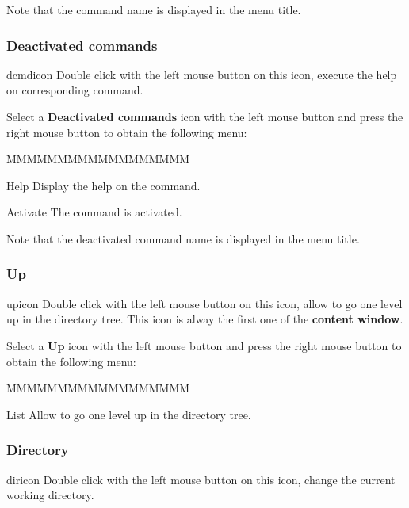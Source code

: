 Note that the command name is displayed in the menu title.


\subsubsection{Deactivated \XPAW{} commands}
\begin{ICON}{dcmdicon}
Double click with the left mouse button on this icon, execute the help on
corresponding \XPAW{} command.
\end{ICON}

Select a {\bf Deactivated \XPAW{} commands} icon with the left mouse button
and press the right mouse button to obtain the following menu:


\begin{DLsf}{MMMMMMMMMMMMMMMMMM}
\item[Help]         Display the help on the command.
\item[Activate]     The command is activated.
\end{DLsf}

Note that the deactivated command name is displayed in the menu title.


\subsubsection{Up}
\begin{ICON}{upicon}
Double click with the left mouse button on this icon, allow to go one level up
in the directory tree. This icon is alway the first one of the {\bf content
window}.
\end{ICON}

Select a {\bf Up} icon with the left mouse button and press
the right mouse button to obtain the following menu:


\begin{DLsf}{MMMMMMMMMMMMMMMMMM}
\item[List]         Allow to go one level up in the directory tree.
\end{DLsf}


\subsubsection{Directory}
\begin{ICON}{diricon}
Double click with the left mouse button on this icon, change the current
working directory.
\end{ICON}

